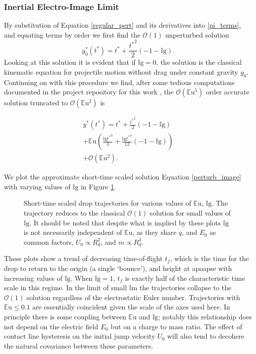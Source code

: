 \documentclass[aip,reprint, floatfix]{revtex4-1}
\begin{document}
\subsubsection{Inertial Electro-Image Limit}
By substitution of Equation \ref{regular_pert} and its derivatives into \ref{pi_terms}, and equating terms by order we first find the $\mathcal{O}(1)$ unperturbed solution
\[{y^*_{0}}{\left ({t^*} \right )} = {t^*} + \frac{{t^*}^{2}}{2} \left(-1 - \mathbb{I}\mbox{g}\right). \]
Looking at this solution it is evident that if $\mathbb{I}\mbox{g}=0$, the solution is the classical kinematic equation for projectile motion without drag under constant gravity $g_0$. Continuing on with this procedure we find, after some tedious computations documented in the project repository for this work \cite{schmidt_droplet_electro-bounce:_2017}, the $\mathcal{O}(\mathbb{E}\mbox{u}^5)$ order accurate solution truncated to $\mathcal{O}(\mathbb{E}\mbox{u}^2)$ is

\begin{gather}
{y^*}({t^*}) = {t^*} + \frac{{t^*}^{2}}{2} \left(-1 - \mathbb{I}\mbox{g}\right) \nonumber \\
 + \mathbb{E}\mbox{u} \left(\frac{\mathbb{I}\mbox{g} {t^*}^{3}}{3} + \frac{\mathbb{I}\mbox{g} {t^*}^{4}}{12} \left(-1 - \mathbb{I}\mbox{g} \right)\right) \nonumber \\
 + \mathcal{O}(\mathbb{E}\mbox{u}^2). \label{perturb_image}
\end{gather}

We plot the approximate short-time scaled solution Equation \ref{perturb_image} with varying values of $\mathbb{I}\mbox{g}$ in Figure \ref{fig:short_times}.

\begin{figure}[htp]
    \resizebox{0.8\textwidth}{!}{}
    \caption{Short-time scaled drop trajectories for various values of $\mathbb{E}\mbox{u}$, $\mathbb{I}\mbox{g}$. The trajectory reduces to the classical $\mathcal{O}(1)$ solution for small values of $\mathbb{I}\mbox{g}$. It should be noted that despite what is implied by these plots $\mathbb{I}\mbox{g}$ is not necessarily independent of $\mathbb{E}\mbox{u}$, as they share $q$, and $E_0$ as common factors, $U_0 \propto R_d^2$, and $m \propto R_d^3$.}
    \label{fig:short_times}
\end{figure}
These plots show a trend of decreasing time-of-flight $t_f$, which is the time for the drop to return to the origin (a single `bounce'), and height at apoapse with increasing values of $\mathbb{I}\mbox{g}$. When $\mathbb{I}\mbox{g} = 1$, $t_f$ is exactly half of the characteristic time scale in this regime. In the limit of small $\mathbb{I}\mbox{m}$ the trajectories collapse to the $\mathcal{O}(1)$ solution regardless of the electrostatic Euler number. Trajectories with $\mathbb{E}\mbox{u} \leq 0.1$ are essentially coincident given the scale of the axes used here. In principle there is some coupling between $\mathbb{E}\mbox{u}$ and $\mathbb{I}\mbox{g}$; notably this relationship does not depend on the electric field $E_0$ but on a charge to mass ratio. The effect of contact line hysteresis on the initial jump velocity $U_0$ will also tend to decohere the natural covariance between these parameters.
\end{document}
